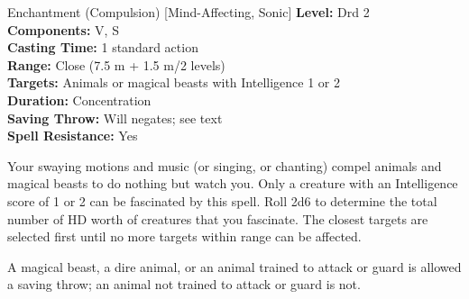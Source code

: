 {Enchantment (Compulsion) [Mind-Affecting, Sonic]}
{
	\textbf{Level:}
	Drd 2\\
	\textbf{Components:}
	V, S\\
	\textbf{Casting Time:}
	1 standard action\\
	\textbf{Range:}
	Close (7.5 m + 1.5 m/2 levels)\\
	\textbf{Targets:}
	Animals or magical beasts with Intelligence 1 or 2\\
	\textbf{Duration:}
	Concentration\\
	\textbf{Saving Throw:}
	Will negates; see text\\
	\textbf{Spell Resistance:}
	Yes\\
}
{
	Your swaying motions and music (or singing, or chanting) compel animals and magical beasts to do nothing but watch you. Only a creature with an Intelligence score of 1 or 2 can be fascinated by this spell. Roll 2d6 to determine the total number of HD worth of creatures that you fascinate. The closest targets are selected first until no more targets within range can be affected.

	A magical beast, a dire animal, or an animal trained to attack or guard is allowed a saving throw; an animal not trained to attack or guard is not.

}
